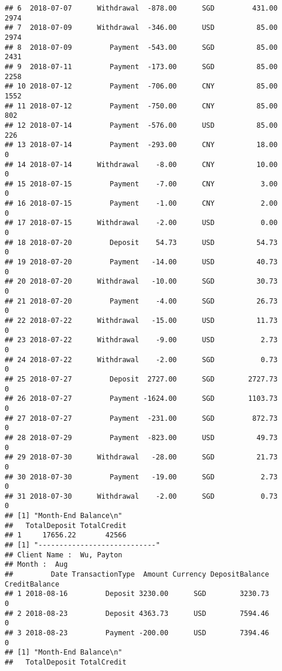 \documentclass[]{article}
\begin{document}
\begin{verbatim}
## 6  2018-07-07      Withdrawal  -878.00      SGD         431.00          2974
## 7  2018-07-09      Withdrawal  -346.00      USD          85.00          2974
## 8  2018-07-09         Payment  -543.00      SGD          85.00          2431
## 9  2018-07-11         Payment  -173.00      SGD          85.00          2258
## 10 2018-07-12         Payment  -706.00      CNY          85.00          1552
## 11 2018-07-12         Payment  -750.00      CNY          85.00           802
## 12 2018-07-14         Payment  -576.00      USD          85.00           226
## 13 2018-07-14         Payment  -293.00      CNY          18.00             0
## 14 2018-07-14      Withdrawal    -8.00      CNY          10.00             0
## 15 2018-07-15         Payment    -7.00      CNY           3.00             0
## 16 2018-07-15         Payment    -1.00      CNY           2.00             0
## 17 2018-07-15      Withdrawal    -2.00      USD           0.00             0
## 18 2018-07-20         Deposit    54.73      USD          54.73             0
## 19 2018-07-20         Payment   -14.00      USD          40.73             0
## 20 2018-07-20      Withdrawal   -10.00      SGD          30.73             0
## 21 2018-07-20         Payment    -4.00      SGD          26.73             0
## 22 2018-07-22      Withdrawal   -15.00      USD          11.73             0
## 23 2018-07-22      Withdrawal    -9.00      USD           2.73             0
## 24 2018-07-22      Withdrawal    -2.00      SGD           0.73             0
## 25 2018-07-27         Deposit  2727.00      SGD        2727.73             0
## 26 2018-07-27         Payment -1624.00      SGD        1103.73             0
## 27 2018-07-27         Payment  -231.00      SGD         872.73             0
## 28 2018-07-29         Payment  -823.00      USD          49.73             0
## 29 2018-07-30      Withdrawal   -28.00      SGD          21.73             0
## 30 2018-07-30         Payment   -19.00      SGD           2.73             0
## 31 2018-07-30      Withdrawal    -2.00      SGD           0.73             0
## [1] "Month-End Balance\n"
##   TotalDeposit TotalCredit
## 1     17656.22       42566
## [1] "----------------------------"
## Client Name :  Wu, Payton 
## Month :  Aug 
##         Date TransactionType  Amount Currency DepositBalance CreditBalance
## 1 2018-08-16         Deposit 3230.00      SGD        3230.73             0
## 2 2018-08-23         Deposit 4363.73      USD        7594.46             0
## 3 2018-08-23         Payment -200.00      USD        7394.46             0
## [1] "Month-End Balance\n"
##   TotalDeposit TotalCredit

\end{verbatim}
\end{document}
